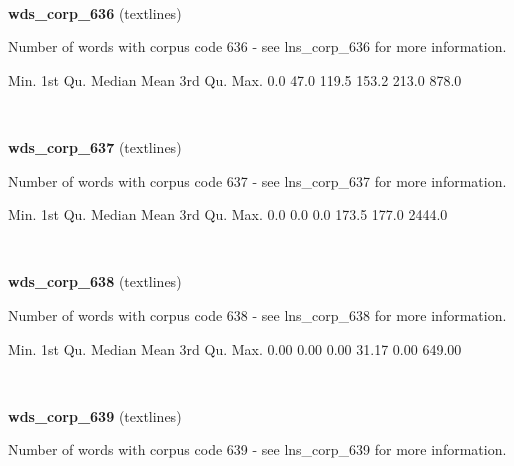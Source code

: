 \documentclass[]{article}
\newenvironment{Shaded}{\begin{snugshade}}{\end{snugshade}}
\newcommand{\FloatTok}[1]{\textcolor[rgb]{0.00,0.00,0.81}{{#1}}}
\newcommand{\NormalTok}[1]{{#1}}
\begin{document}
~

\vspace{1em}

\textbf{wds\_corp\_636} (textlines)

Number of words with corpus code 636 - see lns\_corp\_636 for more
information.

\begin{Shaded}
\begin{Highlighting}[]
   \NormalTok{Min. 1st Qu.  Median    Mean 3rd Qu.    Max. }
    \FloatTok{0.0}    \FloatTok{47.0}   \FloatTok{119.5}   \FloatTok{153.2}   \FloatTok{213.0}   \FloatTok{878.0} 
\end{Highlighting}
\end{Shaded}

~

\vspace{1em}

\textbf{wds\_corp\_637} (textlines)

Number of words with corpus code 637 - see lns\_corp\_637 for more
information.

\begin{Shaded}
\begin{Highlighting}[]
   \NormalTok{Min. 1st Qu.  Median    Mean 3rd Qu.    Max. }
    \FloatTok{0.0}     \FloatTok{0.0}     \FloatTok{0.0}   \FloatTok{173.5}   \FloatTok{177.0}  \FloatTok{2444.0} 
\end{Highlighting}
\end{Shaded}

~

\vspace{1em}

\textbf{wds\_corp\_638} (textlines)

Number of words with corpus code 638 - see lns\_corp\_638 for more
information.

\begin{Shaded}
\begin{Highlighting}[]
   \NormalTok{Min. 1st Qu.  Median    Mean 3rd Qu.    Max. }
   \FloatTok{0.00}    \FloatTok{0.00}    \FloatTok{0.00}   \FloatTok{31.17}    \FloatTok{0.00}  \FloatTok{649.00} 
\end{Highlighting}
\end{Shaded}

~

\vspace{1em}

\textbf{wds\_corp\_639} (textlines)

Number of words with corpus code 639 - see lns\_corp\_639 for more
information.
\end{document}
